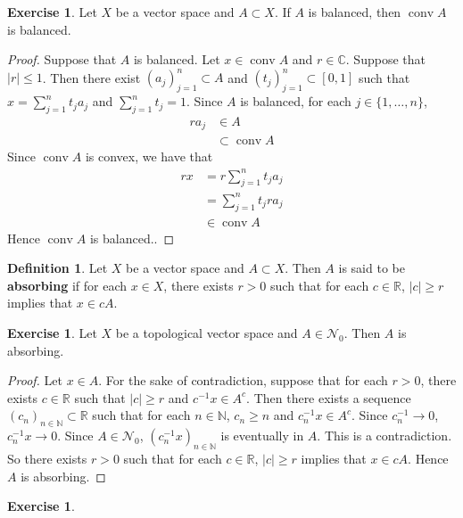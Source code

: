 \documentclass[12pt]{amsart}
\theoremstyle{definition}
\newtheorem{defn}[definition]{Definition}
\newtheorem{ex}[definition]{Exercise}
\newcommand{\C}{\mathbb{C}}
\newcommand{\N}{\mathbb{N}}
\newcommand{\R}{\mathbb{R}}
\newcommand{\MN}{\mathcal{N}}
\newcommand{\tbf}[1]{\textbf{#1}}
\DeclareMathOperator{\cnv}{conv}
\DeclareMathOperator*{\0}{\mbf{0}}
\DeclareMathOperator*{\1}{\mbf{1}}
\begin{document}
	\begin{ex}
		Let $X$ be a vector space and $A \subset X$. If $A$ is balanced, then $\cnv A$ is balanced.
	\end{ex}

	\begin{proof}
		Suppose that $A$ is balanced. Let $x \in \cnv A$ and $r \in \C$. Suppose that $|r| \leq 1$. Then there exist $(a_j)_{j=1}^n \subset A$ and $(t_j)_{j=1}^n \subset [0,1]$ such that $x = \sum\limits_{j=1}^n t_j a_j$ and $\sum\limits_{j=1}^n t_j = 1$. Since $A$ is balanced, for each $j \in \{1, \ldots, n\}$, 
		\begin{align*}
			ra_j 
			&\in A \\
			&\subset \cnv A
		\end{align*}
		Since $\cnv A$ is convex, we have that 
		\begin{align*}
			rx 
			&= r\sum\limits_{j=1}^n t_j a_j\\
			&= \sum\limits_{j=1}^n t_j ra_j\\
			&\in \cnv A
		\end{align*}
		Hence $\cnv A$ is balanced..
	\end{proof}



	\begin{defn}
		Let $X$ be a vector space and $A \subset X$. Then $A$ is said to be \tbf{absorbing} if for each $x \in X$, there exists $r > 0$ such that for each $c \in \R$, $|c| \geq r$ implies that $x \in cA$.
	\end{defn}

	\begin{ex}
		Let $X$ be a topological vector space and $A \in \MN_0$. Then $A$ is absorbing. 
	\end{ex}

	\begin{proof}
		Let $x \in A$. For the sake of contradiction, suppose that for each $r > 0$, there exists $c \in \R$ such that $|c| \geq r$ and $c^{-1}x \in A^c$. Then there exists a sequence $(c_{n})_{n \in \N} \subset \R$ such that for each $n \in \N$, $c_n \geq n$ and $c_n^{-1}x \in A^c$. Since $c_n^{-1} \rightarrow 0$, $c_n^{-1}x \rightarrow 0$. Since $A \in \MN_0$, $(c_n^{-1}x)_{n \in \N}$ is eventually in $A$. This is a contradiction. So there exists $r > 0$ such that for each $c \in \R$, $|c| \geq r$ implies that $x \in cA$. Hence $A$ is absorbing.
	\end{proof}

	\begin{ex}
		
	\end{ex}
	
\end{document}
